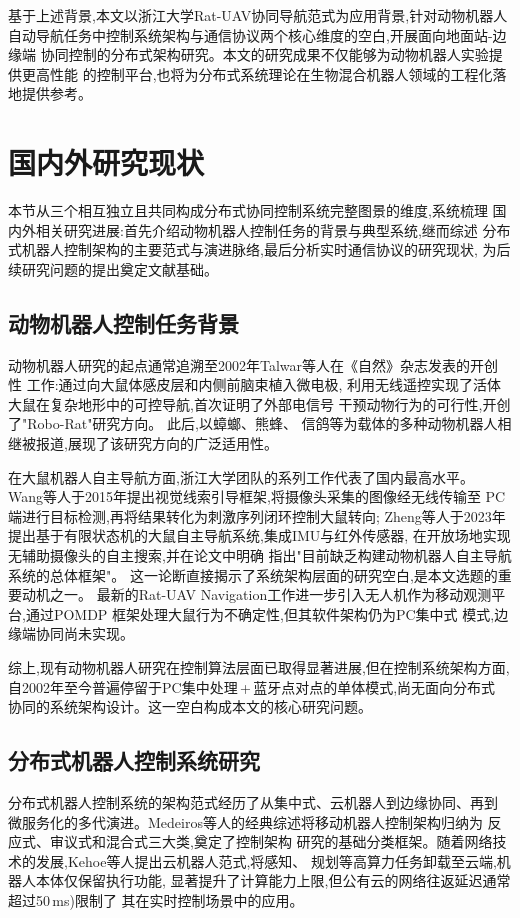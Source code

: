 基于上述背景,本文以浙江大学Rat-UAV协同导航范式为应用背景,针对动物机器人
自动导航任务中控制系统架构与通信协议两个核心维度的空白,开展面向地面站-边缘端
协同控制的分布式架构研究。本文的研究成果不仅能够为动物机器人实验提供更高性能
的控制平台,也将为分布式系统理论在生物混合机器人领域的工程化落地提供参考。


\section{国内外研究现状}
本节从三个相互独立且共同构成分布式协同控制系统完整图景的维度,系统梳理
国内外相关研究进展:首先介绍动物机器人控制任务的背景与典型系统,继而综述
分布式机器人控制架构的主要范式与演进脉络,最后分析实时通信协议的研究现状,
为后续研究问题的提出奠定文献基础。
\subsection{动物机器人控制任务背景}
动物机器人研究的起点通常追溯至2002年Talwar等人在《自然》杂志发表的开创性
工作\cite{talwar2002rat}:通过向大鼠体感皮层和内侧前脑束植入微电极,
利用无线遥控实现了活体大鼠在复杂地形中的可控导航,首次证明了外部电信号
干预动物行为的可行性,开创了"Robo-Rat"研究方向。
此后,以蟑螂\cite{ariyanto2024cockroach}、熊蜂\cite{PlaceholderBumbleBee}、
信鸽等为载体的多种动物机器人相继被报道,展现了该研究方向的广泛适用性。
 
在大鼠机器人自主导航方面,浙江大学团队的系列工作代表了国内最高水平。
Wang等人于2015年提出视觉线索引导框架,将摄像头采集的图像经无线传输至
PC端进行目标检测,再将结果转化为刺激序列闭环控制大鼠转向\cite{wang2015visual};
Zheng等人于2023年提出基于有限状态机的大鼠自主导航系统,集成IMU与红外传感器,
在开放场地实现无辅助摄像头的自主搜索\cite{zheng2023fsm},并在论文中明确
指出"目前缺乏构建动物机器人自主导航系统的总体框架"。
这一论断直接揭示了系统架构层面的研究空白,是本文选题的重要动机之一。
最新的Rat-UAV Navigation工作进一步引入无人机作为移动观测平台,通过POMDP
框架处理大鼠行为不确定性\cite{zheng2024ratuav},但其软件架构仍为PC集中式
模式,边缘端协同尚未实现。
 
综上,现有动物机器人研究在控制算法层面已取得显著进展,但在控制系统架构方面,
自2002年至今普遍停留于PC集中处理\,+\,蓝牙点对点的单体模式,尚无面向分布式
协同的系统架构设计。这一空白构成本文的核心研究问题。

\subsection{分布式机器人控制系统研究}
分布式机器人控制系统的架构范式经历了从集中式、云机器人到边缘协同、再到
微服务化的多代演进。Medeiros等人的经典综述将移动机器人控制架构归纳为
反应式、审议式和混合式三大类\cite{medeiros1998survey},奠定了控制架构
研究的基础分类框架。随着网络技术的发展,Kehoe等人提出云机器人范式,将感知、
规划等高算力任务卸载至云端,机器人本体仅保留执行功能\cite{kehoe2015cloud},
显著提升了计算能力上限,但公有云的网络往返延迟通常超过50\,ms)限制了
其在实时控制场景中的应用。
 
